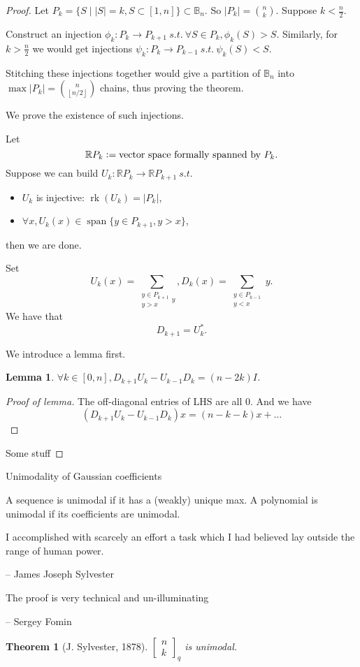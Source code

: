 \documentclass{report}
\newcommand{\R}{\mathbb{R}}
\newcommand{\st}{\ s.t.\ }
\def \rk {\operatorname{rk}}
\def \sp {\operatorname{span}}
\newcommand{\qbin}[2]{\begin{bmatrix}{#1}\\ {#2}\end{bmatrix}_q}
\newcommand{\defeq}{\vcentcolon=}
\newtheorem{theorem}{Theorem}[section]
\newtheorem{lemma}{Lemma}[section]
\theoremstyle{definition}
\theoremstyle{remark}
\numberwithin{equation}{section}
\begin{document}
\begin{proof}
    Let $P_k = \{S \mid |S| = k, S \subset [1, n]\} \subset \mathbb{B}_n$. So $|P_k| = \binom{n}{k}$. Suppose $k < \frac{n}{2}$.
    
    Construct an injection $\phi_k: P_k \to P_{k+1} \st \forall S \in P_k, \phi_k(S) > S$. Similarly, for $k > \frac{n}{2}$ we would get injections $\psi_k: P_k \to P_{k-1} \st \psi_k(S) < S$.

    Stitching these injections together would give a partition of $\mathbb{B}_n$ into $\max|P_k| = \binom{n}{\left\lfloor n/2 \right\rfloor}$ chains, thus proving the theorem.

    We prove the existence of such injections.

    Let \[\R P_k \defeq \text{vector space formally spanned by $P_k$}.\]
    Suppose we can build $U_k: \R P_k \to \R P_{k+1} \st$ \begin{itemize}
        \item $U_k$ is injective: $\rk(U_k) = |P_k|$,
        \item $\forall x, U_k(x) \in \sp \{y \in P_{k+1}, y > x\}$,
    \end{itemize}
    then we are done.

    Set \[U_k(x) = \sum_{\substack{y \in P_{k+1} \\ y > x} y}, D_k(x) = \sum_{\substack{y \in P_{k-1}\\ y < x}}y.\]
    We have that \[D_{k+1} = U^*_k.\]

    We introduce a lemma first.
    \begin{lemma}
        $\forall k \in [0, n], D_{k+1}U_k - U_{k-1}D_k = (n - 2k)I$.
    \end{lemma}
    \begin{proof}[Proof of lemma]\let\qed\relax
       The off-diagonal entries of LHS are all $0$. And we have 
       \[(D_{k+1}U_k - U_{k-1}D_k)x = (n - k - k)x + \ldots\]
    \end{proof}

    Some stuff
\end{proof}

Unimodality of Gaussian coefficients

A sequence is unimodal if it has a (weakly) unique max. A polynomial is unimodal if its coefficients are unimodal.

\epigraph{I accomplished with scarcely an effort a task which I had believed lay outside the range of human power.}{-- \textup{James Joseph Sylvester}}
\epigraph{The proof is very technical and un-illuminating}{-- \textup{Sergey Fomin}}
\begin{theorem}[J. Sylvester, 1878]
    $\qbin{n}{k}$ is unimodal.
\end{theorem}
\end{document}

